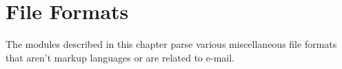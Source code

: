 \chapter{File Formats}
\label{fileformats}

The modules described in this chapter parse various miscellaneous file
formats that aren't markup languages or are related to e-mail.

\localmoduletable
